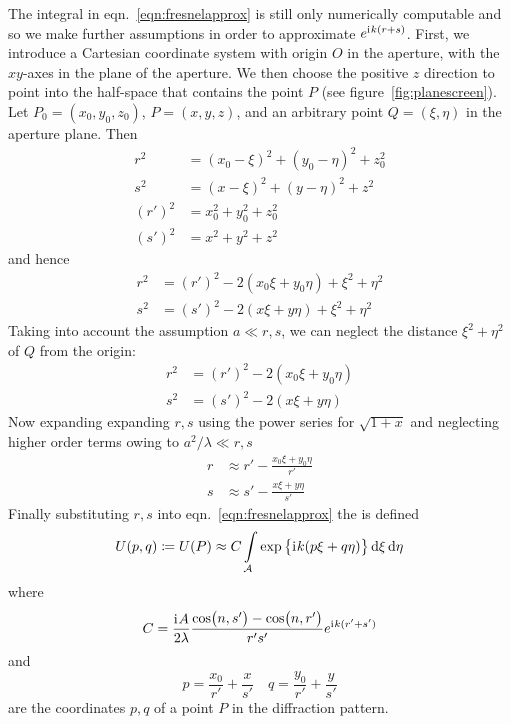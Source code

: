 The integral in eqn.~\eqref{eqn:fresnelapprox} is still only numerically computable and so we make further assumptions in order to approximate \(e^{\mathrm{i}\mkern1mu k (r+s)}\).
%
First, we introduce a Cartesian coordinate system with origin \(O\) in the aperture, with the \(xy\)-axes in the plane of the aperture.
%
We then choose the positive \(z\) direction to point into the half-space that contains the point \(P\) (see figure~\ref{fig:planescreen}).
%
Let \(P_0 = (x_0, y_0, z_0)\), \(P = (x,y,z)\), and an arbitrary point \(Q = (\xi, \eta)\) in the aperture plane.
%
Then
%
\begin{align}
    r^2 &= (x_0-\xi)^2 + (y_0 - \eta)^2 + z_0^2 \\
    s^2 &= (x-\xi)^2 + (y - \eta)^2 + z^2 \\
    (r')^2 &= x_0^2 + y_0^2 + z_0^2 \\
    (s')^2 &= x^2 +y^2 + z^2 
\end{align}
%
and hence
%
\begin{align}
    r^2 &=  (r')^2 - 2 (x_0 \xi + y_0 \eta) + \xi^2 + \eta^2 \\
    s^2 &=  (s')^2 - 2 (x \xi + y\eta) + \xi^2 + \eta^2
\end{align}
%
Taking into account the assumption \(a \ll r,s\), we can neglect the distance \(\xi^2 + \eta^2\) of \(Q\) from the origin:
%
\begin{align}
    r^2 &=  (r')^2 - 2 (x_0 \xi + y_0 \eta) \\
    s^2 &=  (s')^2 - 2 (x \xi + y\eta)
\end{align}
%
Now expanding expanding \(r,s\) using the power series for \(\sqrt{1+x}\) and neglecting higher order terms owing to \(a^2/\lambda \ll r,s\)
%
\begin{align}
    r &\approx r' - \frac{x_0 \xi + y_0 \eta}{r'} \\
    s &\approx s' - \frac{x \xi + y \eta}{s'}
\end{align}
%
Finally substituting \(r,s\) into eqn.~\eqref{eqn:fresnelapprox}
%
the  is defined
%
\begin{equation}
    U(p,q) \coloneqq U(P) \approx C \int\limits_{\mathcal{A}} \exp\left\{\iu k (p \xi + q \eta ) \right\} \dif \xi \dif \eta \label{eqn:fraunhoderapprox}
\end{equation}
%
where
%   
\begin{equation}
    C = \frac{\mathrm{i}\mkern1mu A}{2 \lambda} \frac{\cos(n, s') - \cos(n, r')}{r's'} e^{\mathrm{i}\mkern1mu k (r' + s')}
\end{equation}
%
and
%
\begin{equation}
    p = \frac{x_0}{r'} + \frac{x}{s'} \quad q = \frac{y_0}{r'} + \frac{y}{s'} 
\end{equation}
%
are the coordinates \(p,q\) of a point \(P\) in the diffraction pattern.

